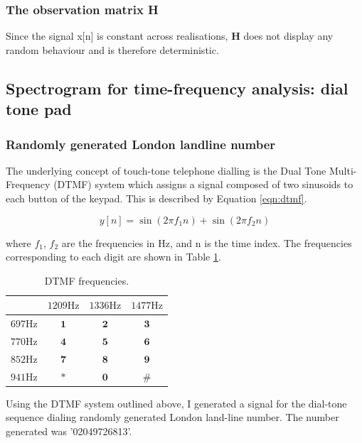 \subsubsection{The observation matrix H}

Since the signal x[n] is constant across realisations, $\boldsymbol{H}$ does not display any random behaviour and is therefore deterministic. 
\subsection{Spectrogram for time-frequency analysis: dial tone pad}

\subsubsection{Randomly generated London landline number}

The underlying concept of touch-tone telephone dialling is the Dual Tone Multi-Frequency (DTMF) system which assigns a signal composed of two sinusoids to each button of the keypad. This is described by Equation \ref{eqn:dtmf}.

\begin{equation}
y[n]=\sin \left(2 \pi f_{1} n\right)+\sin \left(2 \pi f_{2} n\right)
\label{eqn:dtmf}
\end{equation}

\noindent
where $f_1$, $f_2$ are the frequencies in Hz, and n is the time index. The frequencies corresponding to each digit are shown in Table \ref{Tab:DTMF}.

\begin{table}[H]
\centering
\begin{tabular}{c|c|c|c} 
& $1209 \mathrm{Hz}$ & $1336 \mathrm{Hz}$ & $1477 \mathrm{Hz}$ \\
\hline $697 \mathrm{Hz}$ & $\mathbf{1}$ & $\mathbf{2}$ & $\mathbf{3}$ \\
\hline $770 \mathrm{Hz}$ & $\mathbf{4}$ & $\mathbf{5}$ & $\mathbf{6}$ \\
\hline $852 \mathrm{Hz}$ & $\mathbf{7}$ & $\mathbf{8}$ & $\mathbf{9}$ \\
\hline $941 \mathrm{Hz}$ & $*$ & $\mathbf{0}$ & $\#$
\end{tabular}
\caption{DTMF frequencies.}
\label{Tab:DTMF}
\end{table}


\noindent
Using the DTMF system outlined above, I generated a signal for the dial-tone sequence dialing randomly generated London land-line number. The number generated was '02049726813'.

